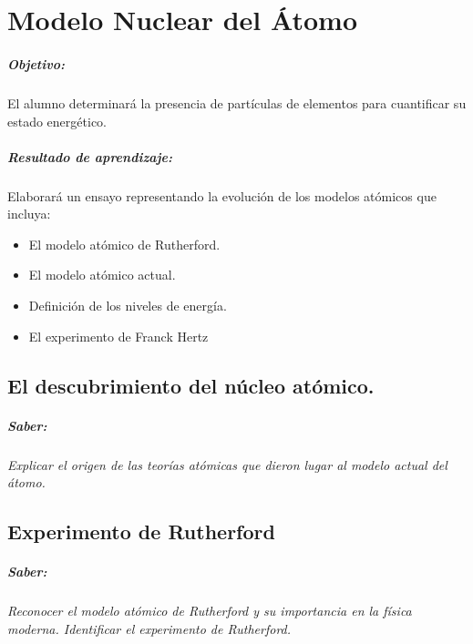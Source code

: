 \chapter{Modelo Nuclear del Átomo}
\paragraph{Objetivo:}
El alumno determinará la presencia de partículas de elementos para cuantificar su estado energético.


\paragraph{Resultado de aprendizaje: }
Elaborará un ensayo representando la  evolución de los modelos atómicos que incluya:
\begin{itemize}
	\item El modelo atómico de Rutherford.
	\item El modelo atómico actual.
	\item Definición de los niveles de energía.
	\item El experimento de Franck Hertz
\end{itemize}
 
\section{El descubrimiento del núcleo atómico.}

\paragraph{Saber: }
\textit{Explicar el origen de las teorías atómicas que dieron lugar al modelo actual del átomo.} 

\section{Experimento de	Rutherford}
\paragraph{Saber: }
\textit{Reconocer el modelo atómico de Rutherford y su importancia en la física moderna. Identificar el 	experimento de Rutherford.}
